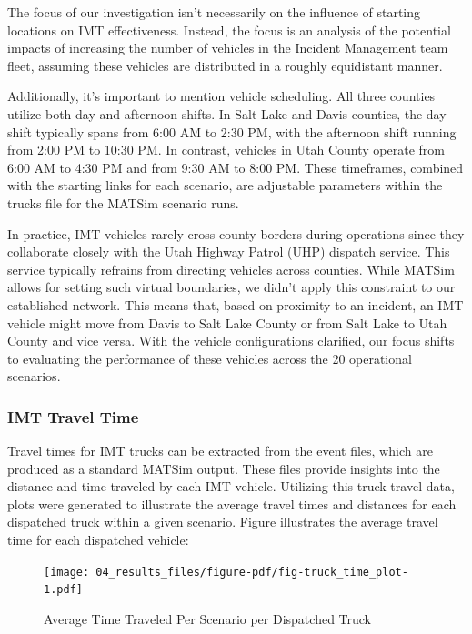 \documentclass[
  letterpaper,
  authoryear]{elsarticle}
\begin{document}
The focus of our investigation isn't necessarily on the influence of
starting locations on IMT effectiveness. Instead, the focus is an
analysis of the potential impacts of increasing the number of vehicles
in the Incident Management team fleet, assuming these vehicles are
distributed in a roughly equidistant manner.

Additionally, it's important to mention vehicle scheduling. All three
counties utilize both day and afternoon shifts. In Salt Lake and Davis
counties, the day shift typically spans from 6:00 AM to 2:30 PM, with
the afternoon shift running from 2:00 PM to 10:30 PM. In contrast,
vehicles in Utah County operate from 6:00 AM to 4:30 PM and from 9:30 AM
to 8:00 PM. These timeframes, combined with the starting links for each
scenario, are adjustable parameters within the trucks file for the
MATSim scenario runs.

In practice, IMT vehicles rarely cross county borders during operations
since they collaborate closely with the Utah Highway Patrol (UHP)
dispatch service. This service typically refrains from directing
vehicles across counties. While MATSim allows for setting such virtual
boundaries, we didn't apply this constraint to our established network.
This means that, based on proximity to an incident, an IMT vehicle might
move from Davis to Salt Lake County or from Salt Lake to Utah County and
vice versa. With the vehicle configurations clarified, our focus shifts
to evaluating the performance of these vehicles across the 20
operational scenarios.

\hypertarget{imt-travel-time}{%
\subsubsection{IMT Travel Time}\label{imt-travel-time}}

Travel times for IMT trucks can be extracted from the event files, which
are produced as a standard MATSim output. These files provide insights
into the distance and time traveled by each IMT vehicle. Utilizing this
truck travel data, plots were generated to illustrate the average travel
times and distances for each dispatched truck within a given scenario.
Figure \citet{truck_time_plot} illustrates the average travel time for
each dispatched vehicle:

\begin{figure}

{\centering \texttt{[image: 04\_results\_files/figure-pdf/fig-truck\_time\_plot-1.pdf]}

}

\caption{\label{fig-truck_time_plot}Average Time Traveled Per Scenario
per Dispatched Truck}

\end{figure}
\end{document}
